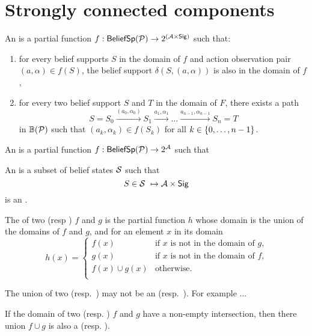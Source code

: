%
\section{Strongly connected components}
%
\begin{definition}
%
An \emphdef{\aodscc} is a partial function $f : \mathsf{BeliefSp}(\mathcal{P}) \to 2^{(\mathcal{A}\times\mathsf{Sig})}$ such that:
\begin{enumerate}
    \item for every belief supports $S$ in the domain of $f$ and action observation pair $(a,\alpha) \in f(S)$,
    the belief support $\delta(S,(a,\alpha))$ is also in the domain of $f$,
    \item for every two belief support $S$ and $T$ in the domain of $F$, there exists a path
    \[
    S = S_0 \xrightarrow{(a_0,\alpha_0)}
    S_1 \xrightarrow{a_1,\alpha_1} 
    \dots
    \xrightarrow{a_{n-1},\alpha_{n-1}}
    S_n = T
    \]
    in $\mathbb{B}(\mathcal{P})$ such that $(a_k,\alpha_k)\in f(S_k)$ for all $k\in\left\lbrace 0,\dots,n-1\right\rbrace$.
\end{enumerate}
\end{definition}
%
\begin{definition}
%
An \emphdef{\adscc} is a partial function $f : \mathsf{BeliefSp}(\mathcal{P}) \to 2^{\mathcal{A}}$ such that 
%
\end{definition}
%
\begin{definition}
An \emphdef{\scc{}} is a subset of belief states $\mathcal{S}$ such that
\[
S\in\mathcal{S} \ \mapsto \mathcal{A}\times\mathsf{Sig}
\]
is an \adscc{}. 
\end{definition}
%
\begin{definition}
The  of two \adscc{} (resp 
\aodscc{}) $f$ and $g$ is the partial function $h$ whose domain is the union of the domains of $f$ and $g$,
and for an element $x$ in its domain
\[
h(x) =
\begin{cases}
f(x) & \text{if $x$ is not in the domain of $g$,} \\
g(x) & \text{if $x$ is not in the domain of $f$,} \\
f(x)\cup g(x) & \text{otherwise}. \\
\end{cases}
\]
\end{definition}
%
\begin{remark}
The union of two \adscc{} (resp.\ \aodscc{}) may not be an \adscc{} (resp.\ \aodscc).
For example ... 
\end{remark}
%
\begin{lemma}
If the domain of two \adscc{} (resp. \aodscc) $f$ and $g$ have a non-empty intersection,
then there union $f\cup g$ is also a \adscc{} (resp. \aodscc).
\end{lemma}
